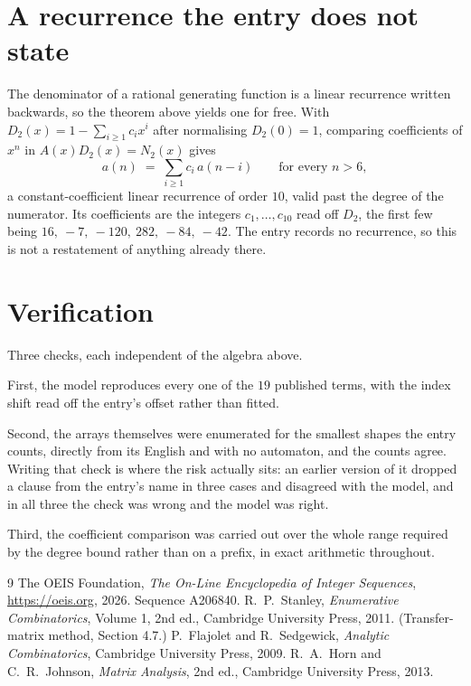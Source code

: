 \documentclass[11pt,a4paper]{article}
\theoremstyle{plain}
\theoremstyle{definition}
\begin{document}
\section{A recurrence the entry does not state}

The denominator of a rational generating function is a linear recurrence written backwards, so
the theorem above yields one for free. With $D_2(x)=1-\sum_{i\ge1}c_ix^i$ after normalising
$D_2(0)=1$, comparing coefficients of $x^n$ in $A(x)D_2(x)=N_2(x)$ gives
\[
a(n)\;=\;\sum_{i\ge1}c_i\,a(n-i)\qquad\text{for every }n>6,
\]
a constant-coefficient linear recurrence of order $10$, valid past the degree of the
numerator. Its coefficients are the integers $c_1,\dots,c_{10}$ read off $D_2$, the first few being $16,\ -7,\ -120,\ 282,\ -84,\ -42$. The entry records no recurrence, so this is not a restatement of anything
already there.

\section{Verification}

Three checks, each independent of the algebra above.

First, the model reproduces every one of the $19$ published terms, with the index shift
read off the entry's offset rather than fitted.

Second, the arrays themselves were enumerated for the smallest shapes the entry counts,
directly from its English and with no automaton, and the counts agree. Writing that check is
where the risk actually sits: an earlier version of it dropped a clause from the entry's name
in three cases and disagreed with the model, and in all three the check was wrong and the model
was right.

Third, the coefficient comparison was carried out over the whole range required by the degree
bound rather than on a prefix, in exact arithmetic throughout.

\begin{thebibliography}{9}
 The OEIS Foundation, \emph{The On-Line Encyclopedia of Integer
Sequences}, \url{https://oeis.org}, 2026. Sequence A206840.
 R.~P.~Stanley, \emph{Enumerative Combinatorics}, Volume 1, 2nd ed.,
Cambridge University Press, 2011. (Transfer-matrix method, Section 4.7.)
 P.~Flajolet and R.~Sedgewick, \emph{Analytic Combinatorics}, Cambridge
University Press, 2009.
 R.~A.~Horn and C.~R.~Johnson, \emph{Matrix Analysis}, 2nd ed., Cambridge
University Press, 2013.
\end{thebibliography}
\end{document}
